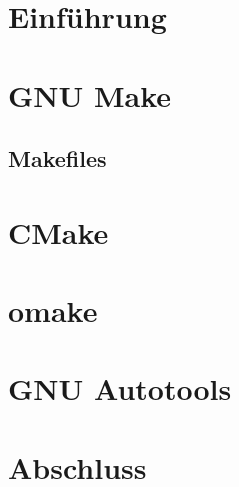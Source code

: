 \documentclass{beamer}
\begin{document}
	\renewcommand{\pause}{}

	\section{Einführung}
	
	

	\section{GNU Make}
		
		\subsection{Makefiles}
		
		
		

	\section{CMake}
		

	\section{omake}
		

	\section{GNU Autotools}
		

	\section{Abschluss}
	
\end{document}

